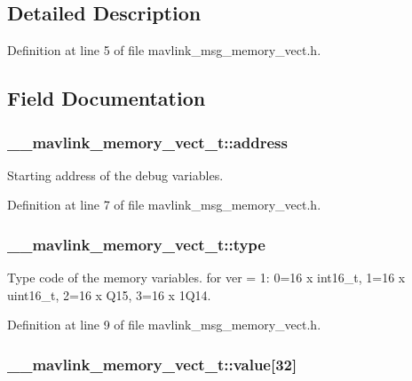 \subsection{Detailed Description}


Definition at line 5 of file mavlink\-\_\-msg\-\_\-memory\-\_\-vect.\-h.



\subsection{Field Documentation}
\hypertarget{struct____mavlink__memory__vect__t_a079a0cecfd6f6e3d47c4c1d324ddd29d}{
\subsubsection[{address}]{ \-\_\-\-\_\-mavlink\-\_\-memory\-\_\-vect\-\_\-t\-::address}}\label{struct____mavlink__memory__vect__t_a079a0cecfd6f6e3d47c4c1d324ddd29d}


Starting address of the debug variables. 



Definition at line 7 of file mavlink\-\_\-msg\-\_\-memory\-\_\-vect.\-h.

\hypertarget{struct____mavlink__memory__vect__t_a5c37b4f5d396209693c7bb32097a6e88}{
\subsubsection[{type}]{ \-\_\-\-\_\-mavlink\-\_\-memory\-\_\-vect\-\_\-t\-::type}}\label{struct____mavlink__memory__vect__t_a5c37b4f5d396209693c7bb32097a6e88}


Type code of the memory variables. for ver = 1\-: 0=16 x int16\-\_\-t, 1=16 x uint16\-\_\-t, 2=16 x Q15, 3=16 x 1\-Q14. 



Definition at line 9 of file mavlink\-\_\-msg\-\_\-memory\-\_\-vect.\-h.

\hypertarget{struct____mavlink__memory__vect__t_a9d2124dfb0efc698eff93eb6744654cf}{
\subsubsection[{value}]{ \-\_\-\-\_\-mavlink\-\_\-memory\-\_\-vect\-\_\-t\-::value\mbox{[}32\mbox{]}}}\label{struct____mavlink__memory__vect__t_a9d2124dfb0efc698eff93eb6744654cf}


